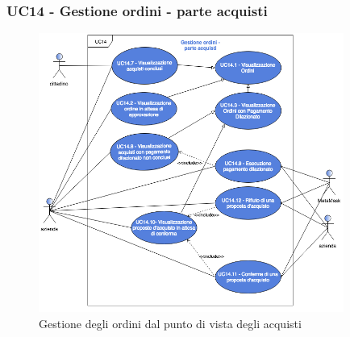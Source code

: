 \subsubsection{UC14 - Gestione ordini - parte acquisti}
\begin{figure}[h]
	\includegraphics[width=10cm]{res/images/UC14ParteAcquisti.png}
	\centering
	\caption{Gestione degli ordini dal punto di vista degli acquisti}

\end{figure}
